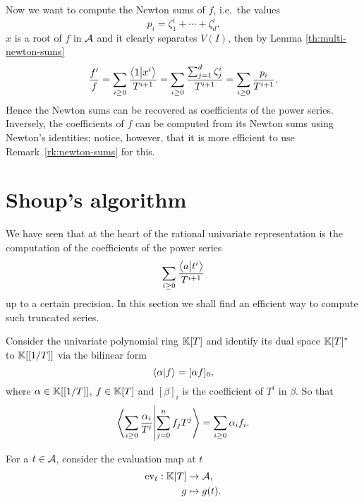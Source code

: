 Now we want to compute the Newton sums of $f$, i.e.\ the values
\begin{equation}
  \label{eq:37}
  p_i = \zeta_1^i + \cdots + \zeta_d^i
  \text{.}
\end{equation}
$x$ is a root of $f$ in $\mathcal{A}$ and it clearly separates $V(I)$,
then by Lemma \ref{th:multi-newton-sums}
\begin{equation}
  \pdfmctwo{One more equality.}
  \label{eq:45}
  \frac{f'}{f} = \sum_{i\ge0}\frac{\braket{1}{x^i}}{T^{i+1}} =
  \sum_{i\ge0}\frac{\sum_{j=1}^d\zeta_j^i}{T^{i+1}} =
  \sum_{i\ge0}\frac{p_i}{T^{i+1}}
  \text{.}
\end{equation}
  Hence the Newton sums can be recovered
as coefficients of the power series. Inversely, the coefficients of
$f$ can be computed from its Newton sums using Newton's identities;
notice, however, that it is more efficient to use
Remark~\ref{rk:newton-sums} for this.


\section{Shoup's algorithm}
\label{sec:shoups-algorithm}

We have seen that at the heart of the rational univariate
representation is the computation of the coefficients of the power
series
\begin{equation}
  \label{eq:46}
  \sum_{i\ge0}\frac{\left\langle a \middle| t^i \right\rangle}{T^{i+1}}
\end{equation}
up to a certain precision. In this section we shall find an efficient
way to compute such truncated series.

Consider the univariate polynomial ring $\mathbb{K}[T]$ and identify its dual
space $\mathbb{K}[T]^\ast$ to $\mathbb{K}[[1/T]]$ via the bilinear form
\begin{equation}
  \label{eq:47}
  \left\langle \alpha \middle| f \right\rangle = [\alpha f]_0
  \text{,}
\end{equation}
where $\alpha\in\mathbb{K}[[1/T]]$, $f\in\mathbb{K}[T]$ and $[\beta]_i$ is the
coefficient of $T^i$ in $\beta$. So that
\begin{equation}
  \label{eq:48}
  \left\langle \sum_{i\ge0}\frac{\alpha_i}{T^i} \middle| \sum_{j=0}^nf_jT^j \right\rangle =
  \sum_{i\ge0}\alpha_if_i
  \text{.}
\end{equation}

For a $t\in\mathcal{A}$, consider the  evaluation map at $t$
\begin{equation}
  \label{eq:49}
  \begin{aligned}
    \operatorname{ev}_t : \mathbb{K}[T] &\rightarrow \mathcal{A}\text{,}\\
    g &\mapsto g(t)
    \text{.}
  \end{aligned}
\end{equation}

